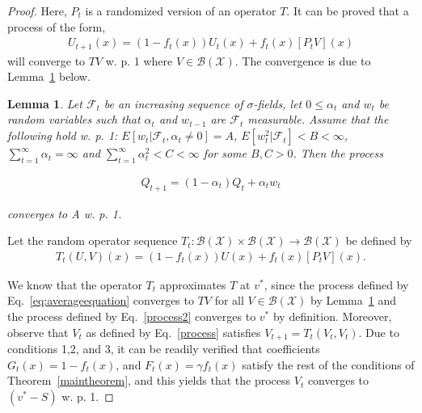 \documentclass[jair, twoside,11pt,theapa]{article}
\newtheorem{lemm}{Lemma}
\begin{document}
\begin{proof}

Here, $P_t$ is a randomized version of an operator $T$. It can be proved that a process of the form,
\begin{equation}\label{eq:averageequation}
    \begin{array}{l}
         U_{t+1}(x) = (1 - f_t(x))U_t(x) + f_t(x) [P_t V](x)
    \end{array}
\end{equation}
will converge to $TV$ w. p. 1 where $V \in \mathcal{B}(\mathscr{X})$. The convergence is due to Lemma~\ref{lemm:conditionalaveraging} below. 



\begin{lemm}\label{lemm:conditionalaveraging}
Let $\mathcal{F}_t$ be an increasing sequence of $\sigma$-fields, let $0\leq \alpha_t$ and $w_t$ be random variables such that $\alpha_t$ and $w_{t-1}$ are $\mathcal{F}_t$ measurable. Assume that the following hold w. p. 1: $E[w_t|\mathcal{F}_t, \alpha_t \neq 0] = A$, $E[w^2_t|\mathcal{F}_t] < B < \infty$, $\sum_{t=1}^{\infty} \alpha_t = \infty$ and $\sum_{t=1}^{\infty} \alpha^2_t < C < \infty$ for some $B,C > 0$. Then the process 

\begin{equation}
    \begin{array}{l}
         Q_{t+1} = (1 - \alpha_t)Q_t + \alpha_t w_t
    \end{array}
\end{equation}

\noindent converges to A w. p. 1. 

\end{lemm}



Let the random operator sequence $T_t: \mathcal{B}(\mathscr{X}) \times \mathcal{B}(\mathscr{X}) \xrightarrow{} \mathcal{B}(\mathscr{X})$ be defined by 
\begin{equation}
    \begin{array}{l}
         T_t(U,V)(x) = (1 - f_t(x))U(x) + f_t(x) [P_t V](x).
    \end{array}
\end{equation}

\noindent We know that the operator $T_t$ approximates $T$ at $v^*$, since the process defined by Eq.~\ref{eq:averageequation} converges to $TV$ for all $V \in \mathcal{B}(\mathscr{X})$ by Lemma~\ref{lemm:conditionalaveraging} and the process defined by Eq.~\ref{process2} converges to $v^*$ by definition.  Moreover, observe that $V_t$ as defined by Eq.~\ref{process} satisfies $V_{t+1} = T_t (V_t, V_t)$. Due to conditions 1,2, and 3, it can be readily verified that coefficients $G_t(x) = 1 - f_t(x)$, and $F_t(x) = \gamma f_t(x)$ satisfy the rest of the conditions of Theorem~\ref{maintheorem}, and this yields that the process $V_t$ converges to $(v^* - S)$ w. p. 1. 

\end{proof}
\end{document}
